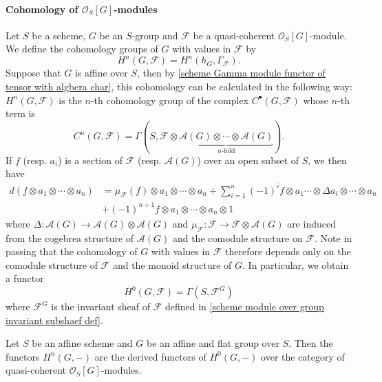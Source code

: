 \paragraph{Cohomology of \texorpdfstring{$\mathscr{O}_S[G]$}{O}-modules}\label{scheme group cohomology of qcoh G-module}
Let $S$ be a scheme, $G$ be an $S$-group and $\mathscr{F}$ be a quasi-coherent $\mathscr{O}_S[G]$-module. We define the cohomology groups of $G$ with values in $\mathscr{F}$ by
\[H^n(G,\mathscr{F})=H^n(h_G,\Gamma_\mathscr{F}).\]
Suppose that $G$ is affine over $S$, then by \cref{scheme Gamma module functor of tensor with algbera char}, this cohomology can be calculated in the following way: $H^n(G,\mathscr{F})$ is the $n$-th cohomology group of the complex $C^\bullet(G,\mathscr{F})$ whose $n$-th term is 
\[C^n(G,\mathscr{F})=\Gamma(S,\mathscr{F}\otimes\underbrace{\mathscr{A}(G)\otimes\cdots\otimes\mathscr{A}(G)}_{\text{$n$-fold}}).\]
If $f$ (resp. $a_i$) is a section of $\mathscr{F}$ (resp. $\mathscr{A}(G)$) over an open subset of $S$, we then have
\begin{align*}
d(f\otimes a_1\otimes\cdots\otimes a_n)&=\mu_\mathscr{F}(f)\otimes a_1\otimes\cdots\otimes a_n+\sum_{i=1}^{n}(-1)^if\otimes a_1\cdots\otimes \Delta a_i\otimes\cdots\otimes a_n\\
&+(-1)^{n+1}f\otimes a_1\otimes\cdots\otimes a_n\otimes 1
\end{align*}
where $\Delta:\mathscr{A}(G)\to\mathscr{A}(G)\otimes\mathscr{A}(G)$ and $\mu_\mathscr{F}:\mathscr{F}\to\mathscr{F}\otimes\mathscr{A}(G)$ are induced from the cogebrea structure of $\mathscr{A}(G)$ and the comodule structure on $\mathscr{F}$. Note in passing that the cohomology of $G$ with values in $\mathscr{F}$ therefore depends only on the comodule structure of $\mathscr{F}$ and the monoid structure of $G$. In particular, we obtain a functor
\[H^0(G,\mathscr{F})=\Gamma(S,\mathscr{F}^G)\]
where $\mathscr{F}^G$ is the invariant sheaf of $\mathscr{F}$ defined in \cref{scheme module over group invariant subshaef def}.

\begin{theorem}\label{scheme group module over affine flat cohomology is derived}
Let $S$ be an affine scheme and $G$ be an affine and flat group over $S$. Then the functors $H^n(G,-)$ are the derived functors of $H^0(G,-)$ over the category of quasi-coherent $\mathscr{O}_S[G]$-modules. 
\end{theorem}


